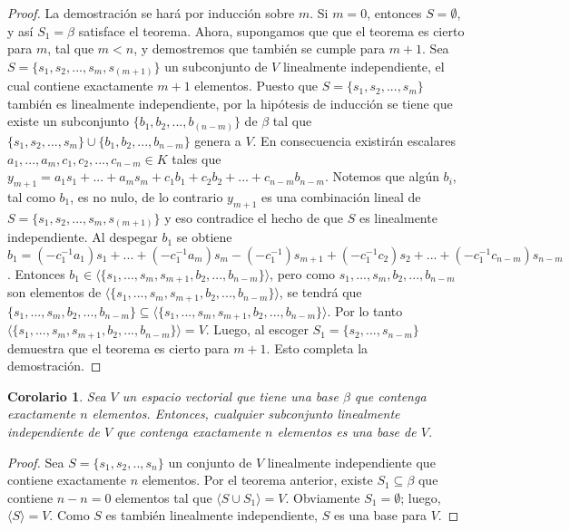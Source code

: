 \documentclass{book}
\newtheorem{corollary}{Corolario}
\begin{document}
\begin{proof}
La demostración se hará por inducción sobre $m$. Si $m=0$, entonces $S=\emptyset$, y así $S_1=\beta$ satisface el teorema. Ahora, supongamos que que el teorema es cierto para $m$, tal que $m<n$, y demostremos que también se cumple para $m+1$. Sea $S=\{s_1,s_2,...,s_m,s_(m+1)\}$ un subconjunto de $V$ linealmente independiente, el cual contiene exactamente $m+1$ elementos. Puesto que $S=\{s_1,s_2,...,s_m\}$ también es linealmente independiente, por la hipótesis de inducción se tiene que existe un subconjunto $\{b_1,b_2,...,b_(n-m)\}$ de $\beta$ tal que $\{s_1,s_2,...,s_m\} \cup \{b_1,b_2,...,b_{n-m}\}$ genera a $V$. En consecuencia existirán escalares $a_1,...,a_m,c_1,c_2,...,c_{n-m} \in K$ tales que $y_{m+1}=a_1s_1+...+a_ms_m+c_1b_1+c_2b_2+...+c_{n-m}b_{n-m}$. Notemos que algún $b_i$, tal como $b_1$, es no nulo, de lo contrario $y_{m+1}$ es una combinación lineal de $S=\{s_1,s_2,...,s_m,s_(m+1)\}$ y eso contradice el hecho de que $S$ es linealmente independiente. Al despegar $b_1$ se obtiene $b_1=(-c_1^{-1}a_1)s_1+...+(-c_1^{-1}a_m)s_m-(-c_1^{-1})s_{m+1}+(-c_1^{-1}c_2)s_2+...+(-c_1^{-1}c_{n-m})s_{n-m}$. Entonces $b_1 \in \langle \{s_1,...,s_m,s_{m+1},b_2,...,b_{n-m} \} \rangle$, pero como $s_1,...,s_m,b_2,...,b_{n-m}$ son elementos de $ \langle \{s_1,...,s_m,s_{m+1},b_2,...,b_{n-m} \} \rangle$, se tendrá que $\{s_1,...,s_m,b_2,...,b_{n-m}\} \subseteq  \langle \{s_1,...,s_m,s_{m+1},b_2,...,b_{n-m} \} \rangle$. Por lo tanto $\langle \{s_1,...,s_m,s_{m+1},b_2,...,b_{n-m} \} \rangle = V$. Luego, al escoger $S_1=\{s_2,...,s_{n-m} \}$ demuestra que el teorema es cierto para $m+1$. Esto completa la demostración.
\end{proof}

\begin{corollary}
Sea $V$ un espacio vectorial que tiene una base $\beta$ que contenga exactamente $n$ elementos. Entonces, cualquier subconjunto linealmente independiente de $V$ que contenga exactamente $n$ elementos es una base de $V$.
\end{corollary}

\begin{proof}
Sea $S=\{s_1,s_2,..,s_n\}$ un conjunto de $V$ linealmente independiente que contiene exactamente $n$ elementos. Por el teorema anterior, existe $S_1 \subseteq \beta$ que contiene $n-n=0$ elementos tal que $\langle S \cup S_1\rangle =V$. Obviamente $S_1=\emptyset$; luego, $\langle S \rangle =V$. Como $S$ es también linealmente independiente, $S$ es una base para $V$.
\end{proof}
\end{document}
